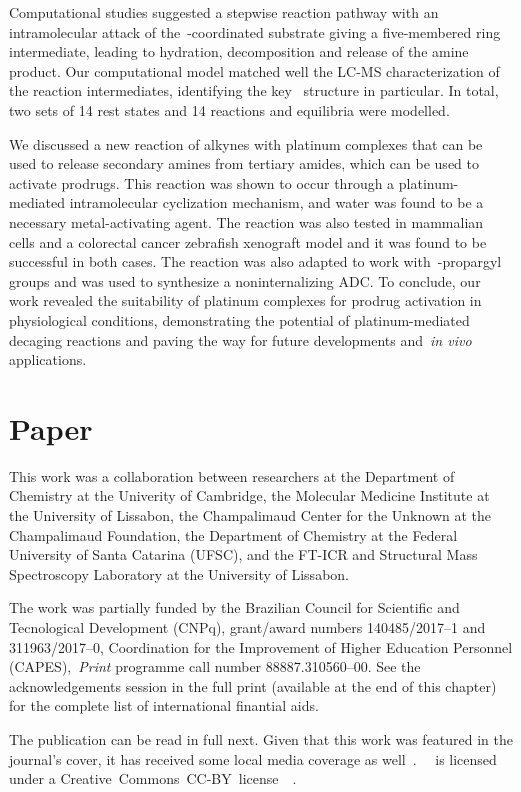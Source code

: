 Computational studies suggested a stepwise reaction pathway with an intramolecular attack
of the~-coordinated substrate giving a five-membered ring intermediate,
leading to hydration,
decomposition and release of the amine product.
Our computational model matched well the LC-MS characterization of the reaction intermediates,
identifying the key~ structure in particular.
In total, two sets of 14 rest states and 14 reactions and equilibria were modelled.

We discussed a new reaction of alkynes with platinum complexes that can be used to release secondary amines from tertiary amides,
which can be used to activate prodrugs.
This reaction was shown to occur through a platinum-mediated intramolecular cyclization mechanism,
and water was found to be a necessary metal-activating agent.
The reaction was also tested in mammalian cells and a colorectal cancer zebrafish xenograft model
and it was found to be successful in both cases.
The reaction was also adapted to work with~-propargyl groups and was used to synthesize a noninternalizing ADC.\@
To conclude,
our work revealed the suitability of platinum complexes for prodrug activation in physiological conditions,
demonstrating the potential of platinum-mediated decaging reactions
and paving the way for future developments and~\emph{in vivo} applications.

\section{Paper}

This work was a collaboration between researchers
at the Department of Chemistry at the Univerity of Cambridge,
the Molecular Medicine Institute at the University of Lissabon,
the Champalimaud Center for the Unknown at the Champalimaud Foundation,
the Department of Chemistry at the Federal University of Santa Catarina (UFSC),
and the FT-ICR and Structural Mass Spectroscopy Laboratory at the University of Lissabon.

The work was partially funded by the Brazilian Council for Scientific and Tecnological Development (CNPq),
grant/award numbers 140485/2017--1 and 311963/2017--0,
Coordination for the Improvement of Higher Education Personnel (CAPES),~\emph{Print} programme call number 88887.310560--00.
See the acknowledgements session in the full print
(available at the end of this chapter)
for the complete list of international finantial aids.

The publication can be read in full next.
Given that this work was featured in the journal's cover,
it has received some local media coverage as well~\cite{noticias-da-ufsc2020}.~\citeauthor{Oliveira_2020}~\cite{Oliveira_2020}
is licensed under a
Creative~Commons~CC-BY~license~\ccby~\cite{ACS_CCBY_2014}.


